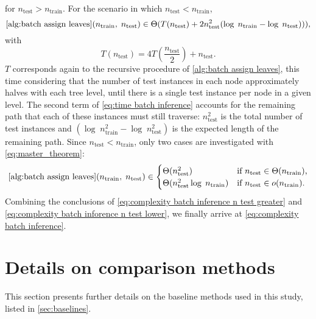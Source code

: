 \documentclass[sn-mathphys-num]{sn-jnl}%
\theoremstyle{thmstyleone}%
\theoremstyle{thmstyletwo}%
\theoremstyle{thmstylethree}%
\begin{document}
\begin{appendices}
for $n_\text{test} > n_\text{train}$.
For the scenario in which $n_\text{test} < n_\text{train}$,
%
\begin{equation}
    \label{eq:time batch inference}
    \text{\ref{alg:batch assign leaves}}(n_\text{train},\; n_\text{test})
        \in \Theta(
            T(n_\text{test}) 
            + 2 n_\text{test}^2 (\log\;n_\text{train} - \log\; n_\text{test}))
        )
    \text{,}
\end{equation}
%
with
%
\begin{equation}
    T(n_\text{test}) = 4T\left(\frac{n_\text{test}}{2}\right) + n_\text{test}
    \text{.}
    \label{eq:recurrence predict 2}
\end{equation}
%
$T$ corresponds again to the recursive procedure of \autoref{alg:batch assign leaves}, this time considering that the number of test instances in each node approximately halves with each tree level, until there is a single test instance per node in a given level. The second term of \autoref{eq:time batch inference} accounts for the remaining path that each of these instances must still traverse: $n_\text{test}^2$ is the total number of test instances and $(\log\;n^2_\text{train} - \log\; n^2_\text{test})$ is the expected length of the remaining path.
Since $n_\text{test} < n_\text{train}$, only two cases are investigated with \autoref{eq:master_theorem}:
%
\begin{align}
    \label{eq:complexity batch inforence n test lower}
    \text{\ref{alg:batch assign leaves}}(n_\text{train},\; n_\text{test})
        \in \begin{cases}
            \Theta(n_\text{test}^2) & \text{if }n_\text{test} \in \Theta(n_\text{train})\text{,}\\
            \Theta(n_\text{test}^2 \log\;n_\text{train}) & \text{if }n_\text{test} \in o(n_\text{train})
            \text{.}
        \end{cases}
\end{align}
%
Combining the conclusions of \autoref{eq:complexity batch inference n test greater} and \autoref{eq:complexity batch inforence n test lower}, we finally arrive at \autoref{eq:complexity batch inference}.


\section{Details on comparison methods}
\label{sec:baselines details}

This section presents further details on the baseline methods used in this study, listed in \autoref{sec:baselines}.


\end{appendices}
\end{document}
